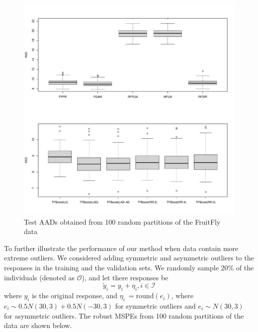 \documentclass{article}
\begin{document}
\begin{figure}
	\includegraphics[scale = 0.5]{figs/Frui_Fly.pdf}
	\caption{Test AADs  obtained from 100 random partitions of the FruitFly data}
	\label{fig:ori}
\end{figure}


To further illustrate the performance of our method when data contain more extreme outliers. We considered adding symmetric and asymmetric outliers to the responses in the training and the validation sets. We randomly sample 20\% of the individuals (denoted as $\mathcal{O}$), and let there responses be 
$$\tilde{y}_{i} = y_i + \eta_i, i \in \mathcal{I}$$ 
where $y_i$ is the original response, and $\eta_i \ = \text{round}(e_i)$, where $e_i \sim 0.5N(30, 3) + 0.5N(-30, 3)$ for symmetric outliers and $e_i \sim N(30, 3)$ for asymmetric outliers. The robust MSPEs from 100 random partitions of the data are shown below. 
\end{document}
